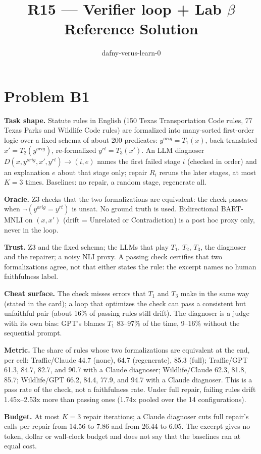 \documentclass[11pt]{article}
\title{R15 --- Verifier loop + Lab $\beta$ \\ \large Reference Solution}
\author{dafny-verus-learn-0}
\date{}
\begin{document}
\maketitle
\sloppy
\section*{Problem B1}\label{ans:B1}
\begin{answer}
\textbf{Task shape.} Statute rules in English (150 Texas Transportation Code
rules, 77 Texas Parks and Wildlife Code rules) are formalized into many-sorted
first-order logic over a fixed schema of about 200 predicates:
$y^{orig}=T_1(x)$, back-translated $x'=T_2(y^{orig})$, re-formalized
$y^{rt}=T_3(x')$. An LLM diagnoser $D(x,y^{orig},x',y^{rt})\to(i,e)$ names the
first failed stage $i$ (checked in order) and an explanation $e$ about that
stage only; repair $R_i$ reruns the later stages, at most $K=3$ times.
Baselines: no repair, a random stage, regenerate all.

\textbf{Oracle.} Z3 checks that the two formalizations are equivalent: the
check passes when $\neg(y^{orig}=y^{rt})$ is unsat. No ground truth is used.
Bidirectional BART-MNLI on $(x,x')$ (drift = Unrelated or Contradiction) is a
post hoc proxy only, never in the loop.

\textbf{Trust.} Z3 and the fixed schema; the LLMs that play $T_1$, $T_2$,
$T_3$, the diagnoser and the repairer; a noisy NLI proxy. A passing check
certifies that two formalizations agree, not that either states the rule: the
excerpt names no human faithfulness label.

\textbf{Cheat surface.} The check misses errors that $T_1$ and $T_3$ make in
the same way (stated in the card); a loop that optimizes the check can pass a
consistent but unfaithful pair (about 16\% of passing rules still drift). The
diagnoser is a judge with its own bias: GPT's blames $T_1$ 83--97\% of the
time, 9--16\% without the sequential prompt.

\textbf{Metric.} The share of rules whose two formalizations are equivalent at
the end, per cell: Traffic/Claude 44.7 (none), 64.7 (regenerate), 85.3 (full);
Traffic/GPT 61.3, 84.7, 82.7, and 90.7 with a Claude diagnoser;
Wildlife/Claude 62.3, 81.8, 85.7; Wildlife/GPT 66.2, 84.4, 77.9, and 94.7 with
a Claude diagnoser. This is a pass rate of the check, not a faithfulness rate.
Under full repair, failing rules drift 1.45x--2.53x more than passing ones
(1.74x pooled over the 14 configurations).

\textbf{Budget.} At most $K=3$ repair iterations; a Claude diagnoser cuts
full repair's calls per repair from 14.56 to 7.86 and from 26.44 to 6.05. The
excerpt gives no token, dollar or wall-clock budget and does not say that the
baselines ran at equal cost.


\end{answer}
\end{document}
